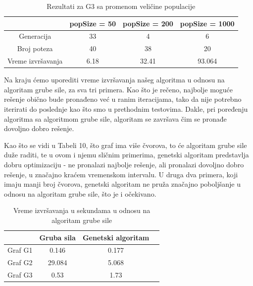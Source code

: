 \documentclass[12pt]{article}
\begin{document}
\begin {table}[H]
\begin{center}
\caption {Rezultati za G3 sa promenom veličine populacije} \label{tab:title} 
\begin{tabular}{|| c|c c c||} 	
	\hline
	& popSize = 50 & popSize = 200 & popSize = 1000 \\ 
	\hline\hline
	Generacija & 33 & 4 & 6 \\ 
	\hline
	Broj poteza & 40 & 38 & 20 \\
	\hline
	Vreme izvršavanja & 6.18 & 32.41 & 93.064 \\
	\hline
\end{tabular}
\end{center}
\end{table}
	

Na kraju ćemo uporediti vreme izvršavanja našeg algoritma u odnosu na algoritam grube sile, za sva tri primera. Kao što je rečeno, najbolje moguće rešenje obično bude pronađeno već u ranim iteracijama, tako da nije potrebno iterirati do poslednje kao što smo u prethodnim testovima. Dakle, pri poređenju algoritma sa algoritmom grube sile, algoritam se završava čim se pronađe dovoljno dobro rešenje.
	\par Kao što se vidi u Tabeli 10, što graf ima više čvorova, to će algoritam grube sile duže raditi, te u ovom i njemu sličnim primerima, genetski algoritam predstavlja dobru optimizaciju - ne pronalazi najbolje rešenje, ali pronalazi dovoljno dobro rešenje, u značajno kraćem vremenskom intervalu. U druga dva primera, koji imaju manji broj čvorova, genetski algoritam ne pruža značajno poboljšanje u odnosu na algoritam grube sile, što je i očekivano. 

	\begin {table}[H]
\begin{center}
	\caption {Vreme izvršavanja u sekundama u odnosu na algoritam grube sile} \label{tab:title} 
	\begin{tabular}{|| c|c c c||} 	
		\hline
		& Gruba sila & Genetski algoritam & \\ 
		\hline\hline
		Graf G1 &  0.146 & 0.177 & \\ 
		\hline
		Graf G2 & 29.084 & 5.068 & \\
		\hline
		Graf G3 & 0.53 & 1.73 & \\
		\hline
	\end{tabular}
\end{center}
\end{table}
\end{document}
